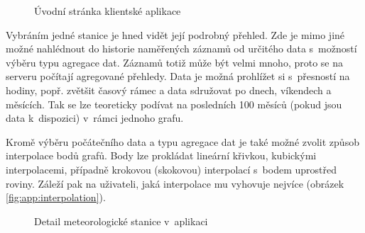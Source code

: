 \begin{figure}[h]
	\centering
	\caption{Úvodní stránka klientské aplikace}
	\label{fig:app:homepage}
\end{figure}

Vybráním jedné stanice je hned vidět její podrobný přehled. Zde je mimo jiné možné nahlédnout do historie naměřených záznamů od určitého data s~možností výběru typu agregace dat. Záznamů totiž může být velmi mnoho, proto se na serveru počítají agregované přehledy. Data je možná prohlížet si s~přesností na hodiny, popř. zvětšit časový rámec a data sdružovat po dnech, víkendech a měsících. Tak se lze teoreticky podívat na posledních 100 měsíců (pokud jsou data k~dispozici) v~rámci jednoho grafu.

Kromě výběru počátečního data a typu agregace dat je také možné zvolit způsob interpolace bodů grafů. Body lze prokládat lineární křivkou, kubickými interpolacemi, případně krokovou (skokovou) interpolací s~bodem uprostřed roviny. Záleží pak na uživateli, jaká interpolace mu vyhovuje nejvíce (obrázek \ref{fig:app:interpolation}).

\begin{figure}[h]
	\centering
	\caption{Detail meteorologické stanice v~aplikaci}
	\label{fig:app:wsDetail}
\end{figure}

